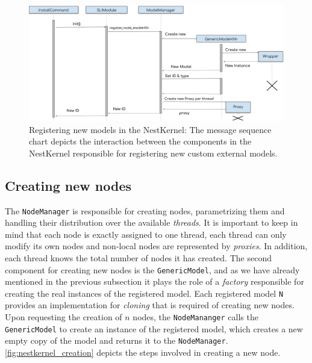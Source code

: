 \vspace{0.5cm}
\begin{figure}[ht!]
\centering
\includegraphics[width=\textwidth]{src/pic/register.png}
\caption{Registering new models in the NestKernel: The message sequence chart depicts the interaction between the components in the NestKernel responsible for registering new custom external models.}
\label{fig:nestkernel_register}
\end{figure}

\subsection{Creating new nodes}

The \texttt{NodeManager} is responsible for creating nodes, parametrizing them and handling their distribution over the available \emph{threads}. It is important to keep in mind that each node is exactly assigned to one thread, each thread can only modify its own nodes and non-local nodes are represented by \emph{proxies}. In addition, each thread knows the total number of nodes it has created. The second component for creating new nodes is the \texttt{GenericModel}, and as we have already mentioned in the previous subsection it plays the role of a \emph{factory} responsible for creating the real instances of the registered model. Each registered model \texttt{N} provides an implementation for \emph{cloning} that is required of creating new nodes. Upon requesting the creation of $n$ nodes, the \texttt{NodeMananger} calls the \texttt{GenericModel} to create an instance of the registered model, which creates a new empty copy of the model and returns it to the \texttt{NodeManager}. \autoref{fig:nestkernel_creation} depicts the steps involved in creating a new node.

